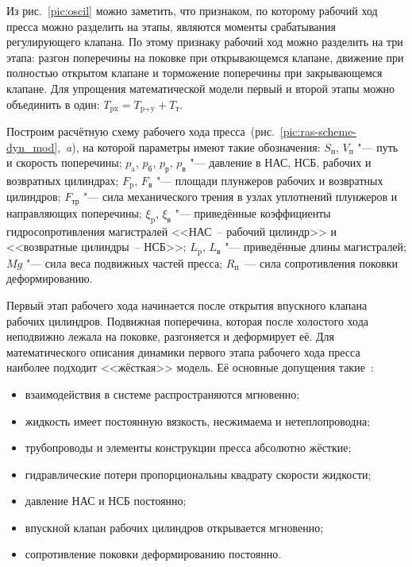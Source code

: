 Из рис.~\ref{pic:oscil} можно заметить, что признаком, по которому рабочий ход пресса можно разделить на этапы, являются моменты срабатывания регулирующего клапана. 
По этому признаку рабочий ход можно разделить на три этапа: разгон поперечины на поковке при открывающемся клапане, движение при полностью открытом клапане и торможение поперечины при закрывающемся клапане. 
Для упрощения математической модели первый и второй этапы можно объединить в один: $ T_\text{px}=T_\text{p+y}+T_\text{т} $.

Построим расчётную схему рабочего хода пресса~(рис.~\ref{pic:ras-scheme-dyn_mod},~{\sl a}\/), на которой параметры имеют такие обозначения:
$  S_\text{п}  $, $  V_\text{п}  $ "---  путь и скорость поперечины;
$  p_\text{a} $, $  p_\text{б} $, $  p_\text{р} $, $  p_\text{в} $ "---  давление в НАС, НСБ, рабочих и возвратных цилиндрах;
$ F_\text{p} $, $F_\text{в} $ "---  площади плунжеров рабочих и возвратных цилиндров;
$ F_\text{тр} $ "---  сила механического трения в узлах уплотнений плунжеров и направляющих поперечины;
$ \xi_\text{p} $, $ \xi_\text{в} $ "---  приведённые коэффициенты гидросопротивления магистралей <<НАС~--  рабочий цилиндр>> и <<возвратные цилиндры~--  НСБ>>;
$ L_\text{p} $, $ L_\text{в} $ "---  приведённые длины магистралей;
$ Mg $ "---  сила веса подвижных частей пресса;
$ R_\text{п} $~--- сила сопротивления поковки деформированию.


Первый этап рабочего хода начинается после открытия впускного клапана рабочих цилиндров. 
Подвижная поперечина, которая после холостого хода неподвижно лежала на поковке, разгоняется и деформирует её.
Для математического описания динамики первого этапа рабочего хода пресса наиболее подходит <<жёсткая>> модель. 
Её основные допущения такие~\cite{bib:omd}:
\begin{itemize}
\item взаимодействия в системе распространяются мгновенно;
\item жидкость имеет постоянную вязкость, несжимаема и нетеплопроводна;
\item трубопроводы и элементы конструкции пресса абсолютно жёсткие;
\item гидравлические потери пропорциональны квадрату скорости жидкости;
\item давление НАС и НСБ постоянно;
\item впускной клапан рабочих цилиндров открывается мгновенно;
\item сопротивление поковки деформированию постоянно.
\end{itemize}

